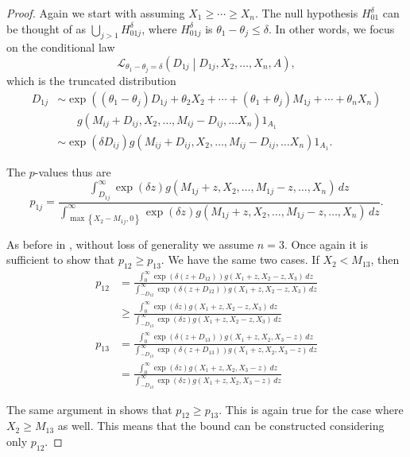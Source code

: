 \documentclass[11pt]{article}
\begin{document}
\begin{proof}

Again we start with assuming $X_1 \ge \cdots \ge X_n$. The null hypothesis $H_{01}^\delta$ can be thought of as $\bigcup_{j > 1} H_{01j}^\delta$, where $H_{01j}^\delta$ is $\theta_1 - \theta_j \le \delta$. In other words, we focus on the conditional law
$$\mathcal{L}_{\theta_1 - \theta_j = \delta} \left(D_{1j} \middle| D_{1j}, X_2, \ldots, X_n, A\right),$$
which is the truncated distribution
\begin{align*}
D_{1j} & \sim \exp\left(\left(\theta_1 - \theta_j\right) D_{1j} + \theta_2 X_2 + \cdots + \left(\theta_1 + \theta_j\right) M_{1j} + \cdots + \theta_n X_n \right) \\
& ~~~~~~~~ g\left(M_{ij} + D_{ij}, X_2, \ldots, M_{ij} - D_{ij}, \ldots X_n\right) 1_{A_1} \\
& \sim \exp\left(\delta D_{ij}\right) g\left(M_{ij} + D_{ij}, X_2, \ldots, M_{ij} - D_{ij}, \ldots X_n\right) 1_{A_1}.
\end{align*}

The $p$-values thus are
$$p_{1j} = \frac{\int_{D_{1j}}^\infty \exp\left(\delta z\right) g\left(M_{1j} + z, X_2, \ldots, M_{1j} - z, \ldots, X_n\right) \,dz}{\int_{\max\left\{X_2 - M_{1j}, 0\right\}}^\infty \exp\left(\delta z\right) g\left(M_{1j} + z, X_2, \ldots, M_{1j} - z, \ldots, X_n\right) \,dz}.$$

As before in , without loss of generality we assume $n = 3$. Once again it is sufficient to show that $p_{12} \ge p_{13}$. We have the same two cases. If $X_2 < M_{13}$, then
\begin{align*}
p_{12} & = \frac{\int_0^\infty \exp\left(\delta \left(z + D_{12}\right)\right) g\left(X_1 + z, X_2 - z, X_3\right) \,dz}{\int_{-D_{12}}^\infty \exp\left(\delta \left(z + D_{12}\right)\right) g\left(X_1 + z, X_2 - z, X_3\right) \,dz} \\
& \ge \frac{\int_0^\infty \exp\left(\delta z\right) g\left(X_1 + z, X_2 - z, X_3\right) \,dz}{\int_{-D_{13}}^\infty \exp\left(\delta z\right) g\left(X_1 + z, X_2 - z, X_3\right) \,dz} \\
p_{13} & = \frac{\int_0^\infty \exp\left(\delta \left(z + D_{13}\right)\right) g\left(X_1 + z, X_2, X_3 - z\right) \,dz}{\int_{-D_{13}}^\infty \exp\left(\delta \left(z + D_{13}\right)\right) g\left(X_1 + z, X_2, X_3 - z\right) \,dz} \\
& = \frac{\int_0^\infty \exp\left(\delta z\right) g\left(X_1 + z, X_2, X_3 - z\right) \,dz}{\int_{-D_{13}}^\infty \exp\left(\delta z\right) g\left(X_1 + z, X_2, X_3 - z\right) \,dz}
\end{align*}

The same argument in  shows that $p_{12} \ge p_{13}$. This is again true for the case where $X_2 \ge M_{13}$ as well. This means that the bound can be constructed considering only $p_{12}$.

\end{proof}
\end{document}
